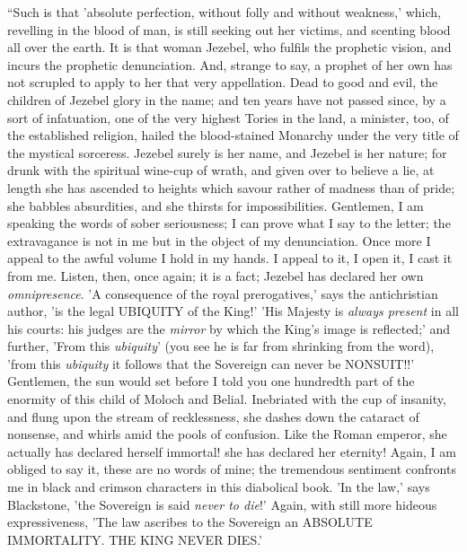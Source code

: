 ``Such is that 'absolute perfection, without folly
and without weakness,' which, revelling in the blood of
man, is still seeking out her victims, and scenting blood
all over the earth. It is that woman Jezebel, who fulfils
the prophetic vision, and incurs the prophetic
denunciation. And, strange to say, a prophet of her own
has not scrupled to apply to her that very appellation.
Dead to good and evil, the children of Jezebel glory in
the name; and ten years have not passed since, by a sort
of infatuation, one of the very highest Tories in the
land, a minister, too, of the established religion,
hailed the blood-stained Monarchy under the very title of
the mystical sorceress. Jezebel surely is her name, and
Jezebel is her nature; for drunk with the spiritual
wine-cup of wrath, and given over to believe a lie, at
length she has ascended to heights which savour rather of
madness than of pride; she babbles absurdities, and she
thirsts for impossibilities. Gentlemen, I am speaking the
words of sober seriousness; I can prove what I say to the
letter; the extravagance is not in me but in the object
of my denunciation. Once more I appeal to the awful
volume I hold in my hands. I appeal to it, I open it, I
cast it from me. Listen, then, once again; it is a fact;
Jezebel has declared her own \emph{omnipresence}. 'A
consequence of the royal prerogatives,' says the
antichristian author, 'is the legal UBIQUITY of the
King!' 'His Majesty is \emph{always present} in all his
courts: his judges are the \emph{mirror} by which the
King's image is reflected;' and further, 'From this \emph{ubiquity}'
(you see he is far from shrinking from the word), 'from
this \emph{ubiquity} it follows that the Sovereign can
never be NONSUIT!!' Gentlemen, the sun would set before I
told you one hundredth part of the enormity of this child
of Moloch and Belial. Inebriated with the cup of
insanity, and flung upon the stream of recklessness, she
dashes down the cataract of nonsense, and whirls amid the
pools of confusion. Like the Roman emperor, she actually
has declared herself immortal! she has declared her
eternity! Again, I am obliged to say it, these are no
words of mine; the tremendous sentiment confronts me in
black and crimson characters in this diabolical book. 'In
the law,' says Blackstone, 'the Sovereign is said \emph{never
to die}!' Again, with still more hideous
expressiveness, 'The law ascribes to the Sovereign an
ABSOLUTE IMMORTALITY. THE KING NEVER DIES.'

